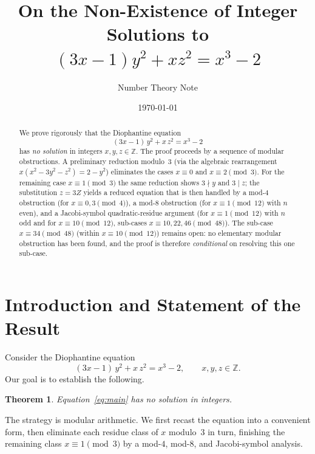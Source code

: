 \documentclass[12pt, a4paper]{amsart}
\title{On the Non-Existence of Integer Solutions to\\[6pt]
$(3x-1)y^2 + xz^2 = x^3 - 2$}
\author{Number Theory Note}
\date{\today}
\theoremstyle{plain}
\newtheorem{theorem}{Theorem}
\theoremstyle{definition}
\begin{document}
\maketitle

\begin{abstract}
We prove rigorously that the Diophantine equation
\[
  (3x - 1)\,y^2 + x\,z^2 = x^3 - 2
\]
has \emph{no solution} in integers $x, y, z \in \mathbb{Z}$.  The proof
proceeds by a sequence of modular obstructions.  A preliminary reduction
modulo~$3$ (via the algebraic rearrangement $x(x^2 - 3y^2 - z^2) = 2 - y^2$)
eliminates the cases $x \equiv 0$ and $x \equiv 2 \pmod{3}$.  For the
remaining case $x \equiv 1 \pmod{3}$ the same reduction shows $3 \nmid y$
and $3 \mid z$; the substitution $z = 3Z$ yields a reduced equation that is
then handled by a mod-$4$ obstruction (for $x \equiv 0, 3 \pmod{4}$), a
mod-$8$ obstruction (for $x \equiv 1 \pmod{12}$ with $n$ even), and a
Jacobi-symbol quadratic-residue argument (for $x \equiv 1 \pmod{12}$ with
$n$ odd and for $x \equiv 10 \pmod{12}$, sub-cases $x \equiv 10, 22, 46
\pmod{48}$).  The sub-case $x \equiv 34 \pmod{48}$ (within $x \equiv 10 \pmod{12}$)
remains open: no elementary modular obstruction has been found, and the
proof is therefore \emph{conditional} on resolving this one sub-case.
\end{abstract}

\tableofcontents

\bigskip

\section{Introduction and Statement of the Result}

Consider the Diophantine equation
\begin{equation}\label{eq:main}
  (3x - 1)\,y^2 + x\,z^2 = x^3 - 2, \qquad x, y, z \in \mathbb{Z}.
\end{equation}
Our goal is to establish the following.

\begin{theorem}\label{thm:main}
  Equation~\eqref{eq:main} has no solution in integers.
\end{theorem}

The strategy is modular arithmetic.  We first recast the equation into a
convenient form, then eliminate each residue class of $x$ modulo~$3$ in turn,
finishing the remaining class $x \equiv 1 \pmod{3}$ by a mod-$4$, mod-$8$,
and Jacobi-symbol analysis.
\end{document}
